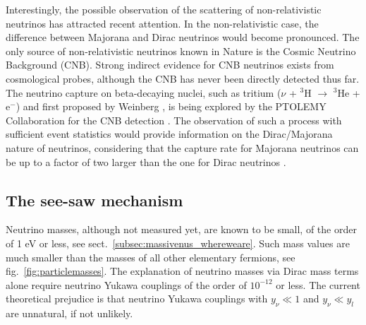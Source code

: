 Interestingly, the possible observation of the scattering of non-relativistic neutrinos has attracted recent attention. In the non-relativistic case, the difference between Majorana and Dirac neutrinos would become pronounced. The only source of non-relativistic neutrinos known in Nature is the Cosmic Neutrino Background (CNB). Strong indirect evidence for CNB neutrinos exists from cosmological probes, although the CNB has never been directly detected thus far. The neutrino capture on beta-decaying nuclei, such as tritium ($\nu$ + $^3$H $\to$ $^3$He + e$^-$) and first proposed by Weinberg \cite{Weinberg:1962zza}, is being explored by the PTOLEMY Collaboration for the CNB detection \cite{PTOLEMY:2019hkd}. The observation of such a process with sufficient event statistics would provide information on the Dirac/Majorana nature of neutrinos, considering that the capture rate for Majorana neutrinos can be up to a factor of two larger than the one for Dirac neutrinos \cite{Long:2014zva}.


\subsection{\label{subsec:massivenus_seesaw}The see-saw mechanism}
%
\indent Neutrino masses, although not measured yet, are known to be small,
 of the order of 1 eV or less, see sect.~\ref{subsec:massivenus_whereweare}. Such mass values are much smaller than the masses of all other elementary fermions, see fig.~\ref{fig:particlemasses}. The explanation of neutrino masses via
 Dirac mass terms alone require neutrino Yukawa couplings of the
 order of $10^{-12}$ or less. The current theoretical prejudice is that
 neutrino Yukawa couplings with $y_{\nu}\ll 1$ and $y_{\nu}\ll y_l$
 are unnatural, if not unlikely. \\

